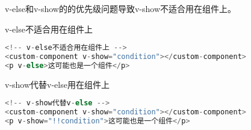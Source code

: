 v-else和v-show的的优先级问题导致v-show不适合用在组件上。

\begin{compactitem}
\item v-else不适合用在组件上

\begin{lstlisting}[language=JavaScript]
<!-- v-else不适合用在组件上 -->
<custom-component v-show="condition"></custom-component>
<p v-else>这可能也是一个组件</p>
\end{lstlisting}

\item v-show代替v-else用在组件上

\begin{lstlisting}[language=JavaScript]
<!-- v-show代替v-else -->
<custom-component v-show="condition"></custom-component>
<p v-show="!!condition">这可能也是一个组件</p>
\end{lstlisting}

\end{compactitem}





\begin{lstlisting}[language=JavaScript]

\end{lstlisting}




\begin{lstlisting}[language=JavaScript]

\end{lstlisting}




\begin{lstlisting}[language=JavaScript]

\end{lstlisting}




\begin{lstlisting}[language=JavaScript]

\end{lstlisting}




\begin{lstlisting}[language=JavaScript]

\end{lstlisting}




\begin{lstlisting}[language=JavaScript]

\end{lstlisting}


